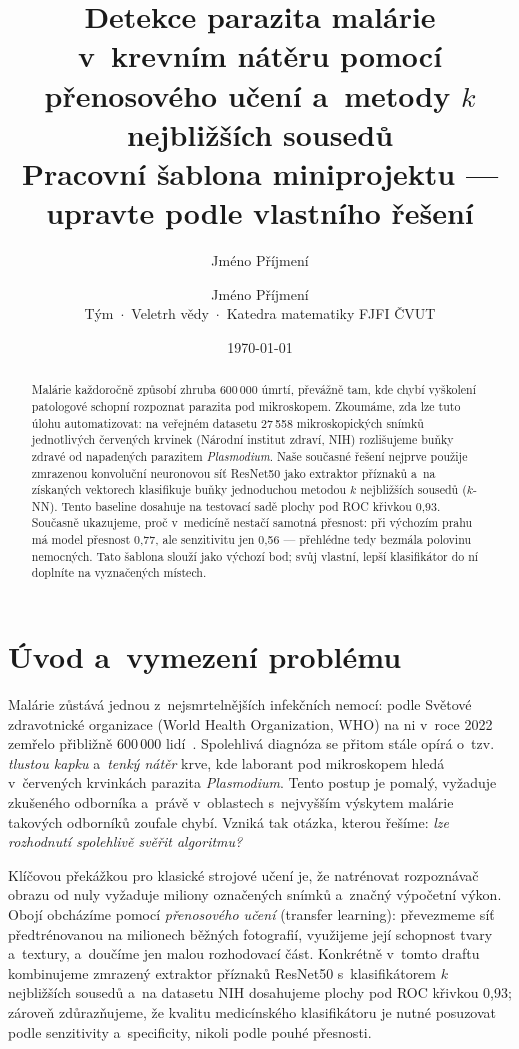 \documentclass[11pt]{article}
\title{\textbf{Detekce parazita malárie v~krevním nátěru pomocí\\
přenosového učení a~metody $k$ nejbližších sousedů}\\[4pt]
\large\textnormal{Pracovní šablona miniprojektu --- upravte podle vlastního řešení}}
\author{Jméno Příjmení \and Jméno Příjmení\\[2pt]
\small Tým \uv{\dots} \,$\cdot$\, Veletrh vědy \,$\cdot$\, Katedra matematiky FJFI ČVUT}
\date{\today}
\newcommand{\Ntotal}{27\,558}
\newcommand{\knnAcc}{0{,}77}        %
\newcommand{\knnSens}{0{,}56}       %
\newcommand{\knnAUC}{0{,}93}
\begin{document}
\maketitle

\begin{abstract}
\noindent
Malárie každoročně způsobí zhruba 600\,000 úmrtí, převážně tam, kde chybí vyškolení
patologové schopní rozpoznat parazita pod mikroskopem. Zkoumáme, zda lze tuto úlohu
automatizovat: na veřejném datasetu \Ntotal{} mikroskopických snímků jednotlivých
červených krvinek (Národní institut zdraví, NIH) rozlišujeme buňky zdravé od napadených
parazitem \emph{Plasmodium}. Naše současné řešení nejprve použije zmrazenou konvoluční
neuronovou síť ResNet50 jako extraktor příznaků a~na získaných vektorech klasifikuje
buňky jednoduchou metodou $k$ nejbližších sousedů ($k$-NN). Tento baseline dosahuje na
testovací sadě plochy pod ROC křivkou \knnAUC{}. Současně ukazujeme, proč v~medicíně
nestačí samotná přesnost: při výchozím prahu má model přesnost \knnAcc{}, ale senzitivitu
jen \knnSens{} --- přehlédne tedy bezmála polovinu nemocných. Tato šablona slouží jako
výchozí bod; svůj vlastní, lepší klasifikátor do ní doplníte na vyznačených místech.
\end{abstract}

\section{Úvod a~vymezení problému}
\label{sec:uvod}

Malárie zůstává jednou z~nejsmrtelnějších infekčních nemocí: podle Světové zdravotnické
organizace (World Health Organization, WHO) na ni v~roce 2022 zemřelo přibližně 600\,000
lidí~\cite{who2023}. Spolehlivá diagnóza se přitom stále opírá o~tzv. \emph{tlustou kapku}
a~\emph{tenký nátěr} krve, kde laborant pod mikroskopem hledá v~červených krvinkách
parazita \emph{Plasmodium}. Tento postup je pomalý, vyžaduje zkušeného odborníka a~právě
v~oblastech s~nejvyšším výskytem malárie takových odborníků zoufale chybí. Vzniká tak
otázka, kterou řešíme: \emph{lze rozhodnutí  spolehlivě svěřit
algoritmu?}

Klíčovou překážkou pro klasické strojové učení je, že natrénovat rozpoznávač obrazu od
nuly vyžaduje miliony označených snímků a~značný výpočetní výkon. Obojí obcházíme pomocí
\emph{přenosového učení} (transfer learning): převezmeme síť předtrénovanou na milionech
běžných fotografií, využijeme její schopnost  tvary a~textury, a~doučíme jen malou
rozhodovací část. Konkrétně v~tomto draftu kombinujeme zmrazený extraktor příznaků ResNet50
s~klasifikátorem $k$ nejbližších sousedů a~na datasetu NIH dosahujeme plochy pod ROC křivkou
\knnAUC{}; zároveň zdůrazňujeme, že kvalitu medicínského klasifikátoru je nutné posuzovat
podle senzitivity a~specificity, nikoli podle pouhé přesnosti.
\end{document}

